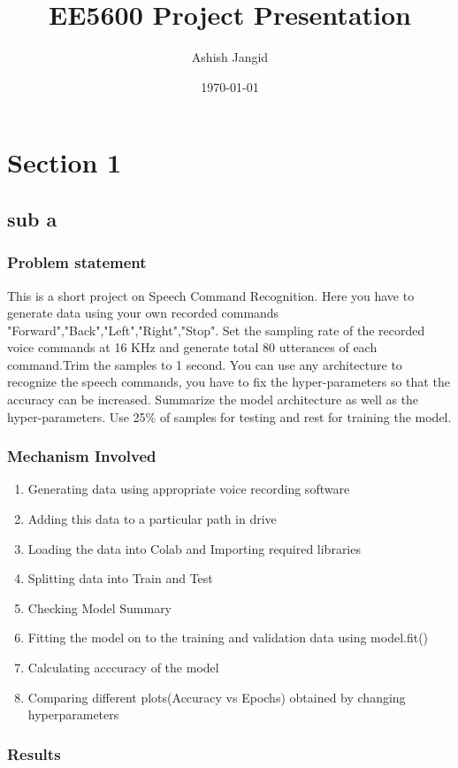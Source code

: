 \documentclass{beamer}
\title{EE5600 Project Presentation}
\author{Ashish Jangid}
\institute{IIT Hyderabad}
\date{\today}
\begin{document}
\begin{frame}
\titlepage
\end{frame}

\section{Section 1}
\subsection{sub a}

\begin{frame}
\frametitle{Problem statement}

This is a short project on Speech Command Recognition.
Here you have to generate data using your own recorded commands "Forward","Back","Left","Right","Stop". Set the sampling rate of the recorded voice commands at 16 KHz and generate total 80 utterances of each command.Trim the samples to 1 second.
You can use any architecture to recognize the speech commands, you have to fix the hyper-parameters so that the accuracy can be increased. Summarize the model architecture as well as the hyper-parameters.
Use 25\% of samples for testing and rest for training the model.

\end{frame}


\begin{frame}
\frametitle{Mechanism Involved}


\begin{enumerate}
 \item Generating data using appropriate voice recording software
  \item Adding this data to a particular path in drive
  \item Loading the data into Colab and Importing required libraries
  \item Splitting data into Train and Test
  \item Checking Model Summary
  \item Fitting the model on to the training and validation data using model.fit()
  \item Calculating acccuracy of the model
  \item Comparing different plots(Accuracy vs Epochs) obtained by changing hyperparameters
\end{enumerate}

\end{frame}


\begin{frame}
\frametitle{Results}
\tableofcontents
\end{frame}
\end{document}

